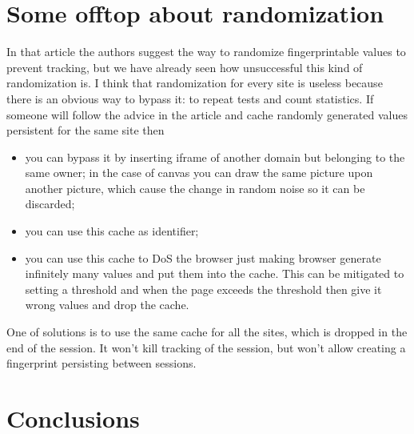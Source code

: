 \documentclass[letterpaper,14pt]{article}
\begin{document}
\section{Some offtop about randomization}\label{some-offtop-about-randomization}

In that article the authors suggest the way to randomize fingerprintable values to prevent tracking, but we have already seen how unsuccessful this kind of randomization is. I think that randomization for every site is useless because there is an obvious way to bypass it: to repeat tests and count statistics. If someone will follow the advice in the article and cache randomly generated values persistent for the same site then

\begin{itemize}
\itemsep1pt\parskip0pt
\item
  you can bypass it by inserting iframe of another domain but belonging to the same owner; in the case of canvas you can draw the same picture upon another picture, which cause the change in random noise so it can be discarded;
\item
  you can use this cache as identifier;
\item
  you can use this cache to DoS the browser just making browser generate infinitely many values and put them into the cache. This can be mitigated to setting a threshold and when the page exceeds the threshold then give it wrong values and drop the cache.
\end{itemize}

One of solutions is to use the same cache for all the sites, which is dropped in the end of the session. It won't kill tracking of the session, but won't allow creating a fingerprint persisting between sessions.

\section{Conclusions}\label{conclusions}
\end{document}
